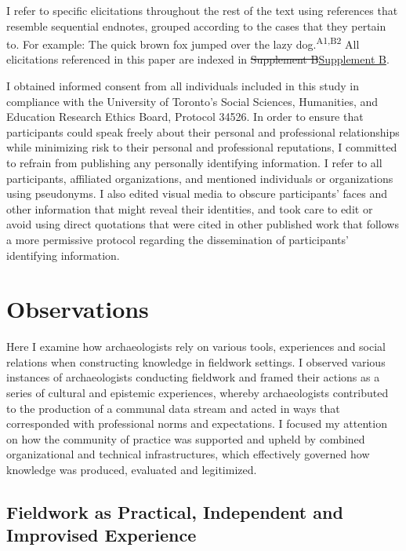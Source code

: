 \documentclass[
]{article}
\makeatletter
\providecommand{\DIFdel}[1]{{\protect\color{red}\sout{#1}}} %
\providecommand{\DIFaddbegin}{} %
\providecommand{\DIFaddend}{} %
\providecommand{\DIFdelbegin}{} %
\providecommand{\DIFdelend}{} %
\newcommand{\DIFscaledelfig}{0.5}
\newlength{\DIFdelgraphicswidth} %
\newlength{\DIFdelgraphicsheight} %
\newcommand{\DIFaddincludegraphics}[2][]{{\color{blue}\fbox{\DIFOincludegraphics[#1]{#2}}}} %
\newcommand{\DIFdelincludegraphics}[2][]{%
\sbox{\DIFdelgraphicsbox}{\DIFOincludegraphics[#1]{#2}}%
\settoboxwidth{\DIFdelgraphicswidth}{\DIFdelgraphicsbox} %
\settoboxtotalheight{\DIFdelgraphicsheight}{\DIFdelgraphicsbox} %
\scalebox{\DIFscaledelfig}{%
\parbox[b]{\DIFdelgraphicswidth}{\usebox{\DIFdelgraphicsbox}\\[-\baselineskip] \rule{\DIFdelgraphicswidth}{0em}}\llap{\resizebox{\DIFdelgraphicswidth}{\DIFdelgraphicsheight}{%
\setlength{\unitlength}{\DIFdelgraphicswidth}%
\begin{picture}(1,1)%
\thicklines\linethickness{2pt} %
{\color[rgb]{1,0,0}\put(0,0){\framebox(1,1){}}}%
{\color[rgb]{1,0,0}\put(0,0){\line( 1,1){1}}}%
{\color[rgb]{1,0,0}\put(0,1){\line(1,-1){1}}}%
\end{picture}%
}\hspace*{3pt}}} %
} %
\DeclareRobustCommand{\DIFaddbegin}{\DIFOaddbegin \let\includegraphics\DIFaddincludegraphics} %
\DeclareRobustCommand{\DIFaddend}{\DIFOaddend \let\includegraphics\DIFOincludegraphics} %
\DeclareRobustCommand{\DIFdelbegin}{\DIFOdelbegin \let\includegraphics\DIFdelincludegraphics} %
\DeclareRobustCommand{\DIFdelend}{\DIFOaddend \let\includegraphics\DIFOincludegraphics} %
\let\sout@orig\sout %
\renewcommand{\sout}[1]{\ifmmode\text{\sout@orig{\ensuremath{#1}}}\else\sout@orig{#1}\fi} %
\makeatother
\begin{document}
I refer to specific elicitations throughout the rest of the text using
references that resemble sequential endnotes, grouped according to the
cases that they pertain to. For example: The quick brown fox jumped over
the lazy dog.\textsuperscript{A1,B2} All elicitations referenced in this
paper are indexed in \DIFdelbegin \DIFdel{Supplement B}\DIFdelend \DIFaddbegin \hyperref[supplement-b]{Supplement B}\DIFaddend .

I obtained informed consent from all individuals included in this study
in compliance with the University of Toronto's Social Sciences,
Humanities, and Education Research Ethics Board, Protocol 34526. In
order to ensure that participants could speak freely about their
personal and professional relationships while minimizing risk to their
personal and professional reputations, I committed to refrain from
publishing any personally identifying information. I refer to all
participants, affiliated organizations, and mentioned individuals or
organizations using pseudonyms. I also edited visual media to obscure
participants' faces and other information that might reveal their
identities, and took care to edit or avoid using direct quotations that
were cited in other published work that follows a more permissive
protocol regarding the dissemination of participants' identifying
information.

\section{Observations}\label{observations}

Here I examine how archaeologists rely on various tools, experiences and
social relations when constructing knowledge in fieldwork settings. I
observed various instances of archaeologists conducting fieldwork and
framed their actions as a series of cultural and epistemic experiences,
whereby archaeologists contributed to the production of a communal data
stream and acted in ways that corresponded with professional norms and
expectations. I focused my attention on how the community of practice
was supported and upheld by combined organizational and technical
infrastructures, which effectively governed how knowledge was produced,
evaluated and legitimized.

\subsection{Fieldwork as Practical, Independent and Improvised
Experience}\label{fieldwork-as-practical-independent-and-improvised-experience}
\end{document}
